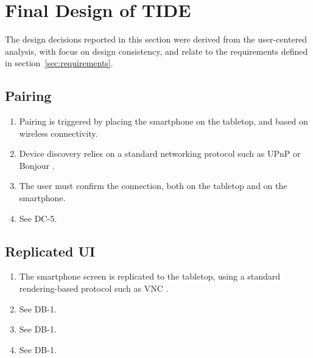 \section{Final Design of TIDE}
\label{sec:design}

The design decisions reported in this section were derived from the user-centered analysis, with focus on design consistency, and relate to the requirements defined in section~\ref{sec:requirements}.

\subsection{Pairing}

\begin{enumerate}[{DA}-1]
\item Pairing is triggered by placing the smartphone on the tabletop, and based on wireless connectivity.
\item Device discovery relies on a standard networking protocol such as UPnP \citep{upnp} or Bonjour \citep{bonjour}.
\item The user must confirm the connection, both on the tabletop and on the smartphone.
\item See DC-5.
\end{enumerate}

\subsection{Replicated UI}

\begin{enumerate}[{DB}-1]
\item The smartphone screen is replicated to the tabletop, using a standard rendering-based protocol such as VNC \citep{Richardson:1998:vnc}.
\item See DB-1.
\item See DB-1.
\item See DB-1.
\end{enumerate}

